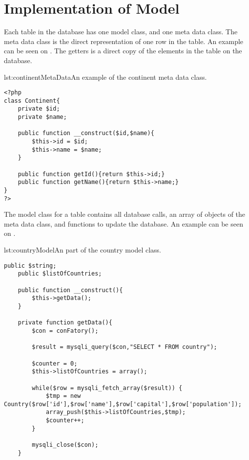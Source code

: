 \section{Implementation of Model}
Each table in the database has one model class, and one meta data class. The meta data class is the direct representation of one row in the table. An example can be seen on . The getters is a direct copy of the elements in the table on the database.

\begin{code}{lst:continentMetaData}{An example of the continent meta data class.}
\begin{lstlisting}
<?php
class Continent{
	private $id;
	private $name;
	
	public function __construct($id,$name){
		$this->id = $id;
		$this->name = $name;
	}
	
	public function getId(){return $this->id;}
	public function getName(){return $this->name;}
}
?>
\end{lstlisting}
\end{code}

The model class for a table contains all database calls, an array of objects of the meta data class, and functions to update the database. An example can be seen on .

\begin{code}{lst:countryModel}{An part of the country model class.}
\begin{lstlisting}
public $string;
	public $listOfCountries;
 
    public function __construct(){
        $this->getData();
    }
	
	private function getData(){
		$con = conFatory();

		$result = mysqli_query($con,"SELECT * FROM country");
		
		$counter = 0;
		$this->listOfCountries = array();
		
		while($row = mysqli_fetch_array($result)) {
			$tmp = new Country($row['id'],$row['name'],$row['capital'],$row['population']);
			array_push($this->listOfCountries,$tmp);
			$counter++;
		}

		mysqli_close($con);
	}
\end{lstlisting}
\end{code}